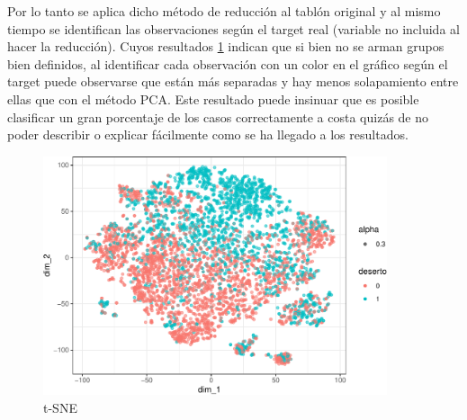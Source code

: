 Por lo tanto se aplica dicho método de reducción al tablón original y al mismo tiempo se identifican las observaciones según el target real (variable no incluida al hacer la reducción). Cuyos resultados \ref{fig:tsne} indican que si bien no se arman grupos bien definidos,
al identificar cada observación con un color en el gráfico según el
target puede observarse que están más separadas y hay menos solapamiento entre ellas que con el método PCA. Este resultado puede insinuar que es posible clasificar un gran porcentaje de los casos correctamente a costa quizás de no poder describir o explicar fácilmente como se ha llegado a los resultados.


\begin{figure}[!htb]
	\centering
	\includegraphics[width=0.9\textwidth]{imagenes/reduccion_dimension/unnamed-chunk-11-1.pdf}
	\caption{t-SNE}
	\label{fig:tsne}
\end{figure}

\clearpage




